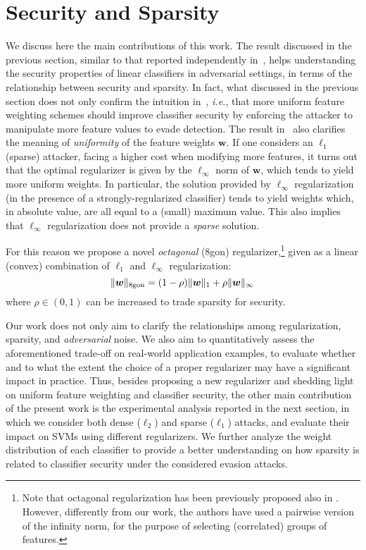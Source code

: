 \documentclass[runningheads,a4paper]{llncs}
\newcommand{\ie}{\emph{i.e.}}
\newcommand{\vct}[1]{\ensuremath{\boldsymbol{#1}}}
\begin{document}
\section{Security and Sparsity}
\label{sect:sec} 
We discuss here the main contributions of this work. The result discussed in the previous section, similar to that reported independently in~\cite{livni12}, helps  understanding the security properties of linear classifiers in adversarial settings, in terms of the relationship between security and sparsity.
In fact, what discussed in the previous section does not only confirm the intuition in~\cite{kolcz09,biggio10-ijmlc}, \ie, that more uniform feature weighting schemes should improve classifier security by enforcing the attacker to manipulate more feature values to evade detection.
The result in~\cite{xu09,sra11,livni12} also clarifies the meaning of \emph{uniformity} of the feature weights $\vct w$.
If one considers an $\ell_{1}$ (sparse) attacker, facing a higher cost when modifying more features, it turns out that the optimal regularizer is given by the $\ell_{\infty}$ norm of $\vct w$, which tends to yield more uniform weights. In particular, the solution provided by $\ell_{\infty}$ regularization (in the presence of a strongly-regularized classifier) tends to yield weights which, in absolute value, are all equal to a (small) maximum value. This also implies that $\ell_{\infty}$ regularization does not provide a \emph{sparse} solution.

For this reason we propose a novel \emph{octagonal} (8gon) regularizer,\footnote{Note that octagonal regularization has been previously proposed also in \cite{bondell08}. However, differently from our work, the authors have used a pairwise version of the infinity norm, for the purpose of selecting (correlated) groups of features.} given as a linear (convex) combination of $\ell_{1}$ and $\ell_{\infty}$ regularization: 
\begin{equation}
\| \vct w \|_{\rm 8gon} = (1-\rho) \| \vct w \|_{1} + \rho \| \vct w \|_{\infty} \,
\end{equation}
where $\rho \in (0,1)$ can be increased to trade sparsity for security.

Our work does not only aim to clarify the relationships among regularization, sparsity, and \emph{adversarial} noise. We also aim to quantitatively assess the aforementioned trade-off on real-world application examples, to evaluate whether and to what the extent the choice of a proper regularizer may have a significant impact in practice. 
Thus, besides proposing a new regularizer and shedding light on uniform feature weighting and classifier security, the other main contribution of the present work is the experimental analysis reported in the next section, in which we consider both dense ($\ell_{2}$) and sparse ($\ell_{1}$) attacks, and evaluate their impact on SVMs using different regularizers. We further analyze the weight distribution of each classifier to provide a better understanding on how sparsity is related to classifier security under the considered evasion attacks.  
\end{document}

